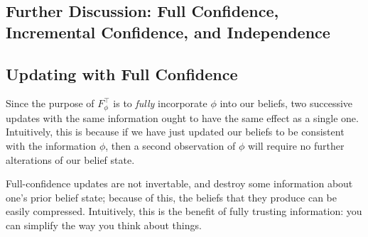 \begin{subappendices}

    \section{Further Discussion: Full Confidence, Incremental Confidence, and Independence}


    \subsection{Updating with Full Confidence}
    	\label{sec:full-conf}
    Since the purpose of
    $F^\top_\phi$
    is to \emph{fully} incorporate $\phi$ into our beliefs,
    two successive updates with the same information ought to have the same effect as a single one.
    Intuitively, this is because if we have just updated our beliefs to be consistent with the information $\phi$, then a second observation of $\phi$ will require no further alterations of our belief state.

    Full-confidence updates are not invertable,
    and destroy some information about one's prior belief state;
    because of this, the beliefs that they produce can be easily compressed.
    Intuitively, this is the benefit of fully trusting information: you
    can simplify the way you think about things.




\end{subappendices}
